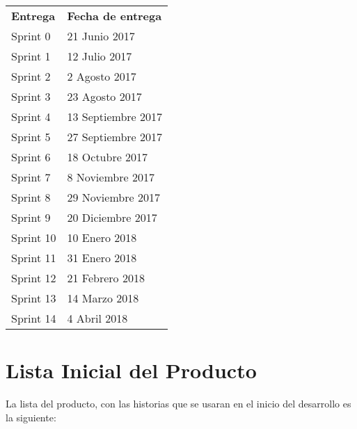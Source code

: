 \begin{table}[h]
	\centering
	\begin{tabular}{| p{2cm} | p{9.3cm} |}
		\rowcolor[HTML]{329A9D} 
		{\color[HTML]{FFFFFF} \textbf{Entrega}} & {\color[HTML]{FFFFFF} \textbf{Fecha de entrega}} \\    
		Sprint 0 & 21 Junio 2017 \\ \hline
		Sprint 1 & 12 Julio 2017 \\ \hline
		Sprint 2 & 2 Agosto 2017 \\ \hline
		Sprint 3 & 23 Agosto 2017 \\ \hline
		Sprint 4 & 13 Septiembre 2017 \\ \hline
		Sprint 5 & 27 Septiembre 2017 \\ \hline
		Sprint 6 & 18 Octubre 2017 \\ \hline
		Sprint 7 & 8 Noviembre 2017 \\ \hline
		Sprint 8 & 29 Noviembre 2017 \\ \hline
		Sprint 9 & 20 Diciembre 2017 \\ \hline
		Sprint 10 & 10 Enero 2018 \\ \hline
		Sprint 11 & 31 Enero 2018 \\ \hline
		Sprint 12 & 21 Febrero 2018 \\ \hline
		Sprint 13 & 14 Marzo 2018 \\ \hline
		Sprint 14 & 4 Abril 2018 \\ \hline
	\end{tabular}
\end{table}

\newpage

\section{Lista Inicial del Producto}

La lista del producto, con las historias que se usaran en el inicio del desarrollo es la siguiente:\\




\newpage

\newpage

\newpage

\newpage

\newpage

\newpage

\newpage

\newpage

\newpage

\newpage

\newpage

\newpage

\newpage

\newpage
